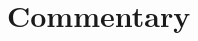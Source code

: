 \documentclass{tutti/report}
\title{\tuttiReportTitle}
\author{\tuttiReportAuthor}
\date{\tuttiGeneratedAt}
\begin{document}
\maketitle


\clearpage
\section*{Commentary}
\end{document}
